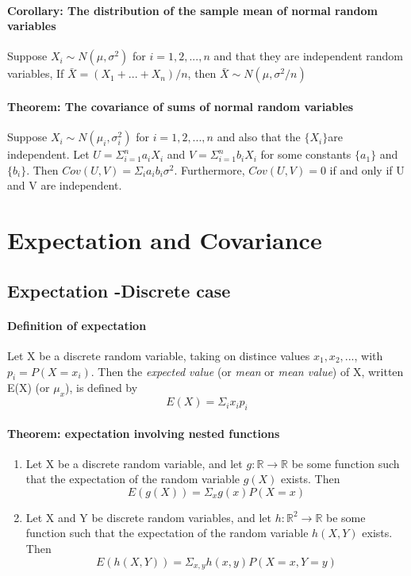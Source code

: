 \documentclass[11pt]{article}
\newcommand{\ti}[1]{\textit{#1}}
\newcommand{\mb}[1]{\mathbb{#1}}
\begin{document}
\paragraph{Corollary: The distribution of the sample mean of normal random variables} Suppose $X_i \sim N(\mu, \sigma^2)$ for $i=1,2,...,n$ and that they are independent random variables, If $\bar X = (X_1 + ... +X_n)/n$, then $\bar X \sim N(\mu,\sigma^2/n)$
\paragraph{Theorem: The covariance of sums of normal random variables}Suppose $X_i \sim N(\mu_i, \sigma_i^2)$ for $i=1,2,...,n$ and also that the $\{X_i\} $are independent. Let $U=\Sigma^n_{i=1}a_iX_i$ and $V=\Sigma^n_{i=1}b_iX_i$ for some constants $\{a_1\}$ and $\{b_i\}$. Then $Cov(U,V) = \Sigma_ia_ib_i\sigma^2$. Furthermore, $Cov(U,V) = 0$ if and only if U and V are independent.
\section{Expectation and Covariance}
\subsection{Expectation -Discrete case}
\paragraph{Definition of expectation} Let X be a discrete random variable, taking on distince values $x_1,x_2,...$, with $p_i = P(X = x_i)$. Then the \ti{expected value} (or \ti{mean} or \ti{mean value}) of X, written E(X) (or $\mu_x$), is defined by $$E(X) = \Sigma_i x_ip_i$$
\paragraph{Theorem: expectation involving nested functions} 
\begin{enumerate}
\item Let X be a discrete random variable, and let $g: \mb{R} \rightarrow \mb{R}$ be some function such that the expectation of the random variable $g(X)$ exists. Then $$E(g(X)) = \Sigma_x g(x)P(X=x)$$
\item Let X and Y be discrete random variables, and let $h: \mb{R}^2 \rightarrow \mb{R}$ be some function such that the expectation of the random variable $h(X,Y)$ exists. Then
$$E(h(X,Y)) = \Sigma_{x,y}h(x,y)P(X=x,Y=y)$$
\end{enumerate}
\end{document}
